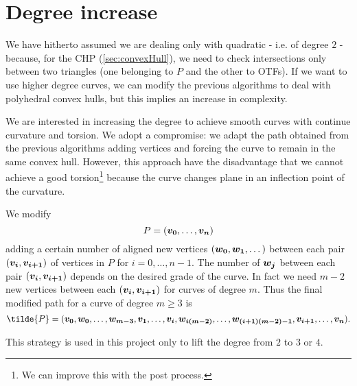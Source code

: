 \documentclass[dissertation.tex]{subfiles}
\begin{document}
\section{Degree increase}\label{sec:degreeInc}
We have hitherto assumed we are dealing only with quadratic \bss{} -
i.e. of degree $2$ - because,
for the \ac{CHP} (\cref{sec:convexHull}), we need to check
intersections only between  two triangles (one belonging to $P$ and the
other to \acp{OTF}). If we want to use higher degree
curves, we can modify the
previous algorithms to deal with polyhedral convex hulls, but this
implies an increase in complexity.

We are interested in increasing the degree to achieve smooth
curves with continue curvature and torsion. We adopt a compromise:
we adapt the path obtained from the previous algorithms adding
vertices and forcing the curve to remain in the same convex
hull. However, this approach have the disadvantage that we cannot achieve a
good torsion\footnote{We can improve this with the post process.}
because the curve changes plane in an inflection point of
the curvature.

We modify 
\begin{equation*}
P=(\boldsymbol{v_0},\dots,\boldsymbol{v_n})  
\end{equation*}
adding a certain number of aligned new vertices
$(\boldsymbol{w_0},\boldsymbol{w_1},\dots)$ between each pair 
$(\boldsymbol{v_i},\boldsymbol{v_{i+1}})$ of vertices in $P$ for $i=0,\dots,n-1$. The
number of $\boldsymbol{w_j}$
between each pair $(\boldsymbol{v_i},\boldsymbol{v_{i+1}})$ depends on the desired
grade of the curve. In fact we need $m-2$ new vertices between each
$(\boldsymbol{v_i},\boldsymbol{v_{i+1}})$ for 
  \bs curves of degree $m$.
Thus the final modified path for a \bs curve of degree $m\ge 3$ is
\begin{equation*}
  \tilde{P}=(\ve{v_0},\ve{w_0},\dots,\ve{w_{m-3}},\ve{v_1},\dots,\ve{v_i},\ve{w_{i(m-2)}},\dots,\ve{w_{(i+1)(m-2)-1}},\ve{v_{i+1}},\dots,\ve{v_n}).
\end{equation*}

This strategy  is used in this project only to lift the degree from $2$ to $3$ or $4$.
\end{document}
